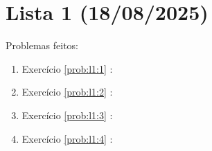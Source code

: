 \clearpage
\section{Lista 1 (18/08/2025)}

Problemas feitos:
\begin{enumerate}
    \item Exercício \ref{prob:l1:1} : \checkmark
    \item Exercício \ref{prob:l1:2} : \checkmark
    \item Exercício \ref{prob:l1:3} : \checkmark
    \item Exercício \ref{prob:l1:4} : \Frowny
\end{enumerate}

\begin{problem}
\label{prob:l1:1}   
\end{problem}

